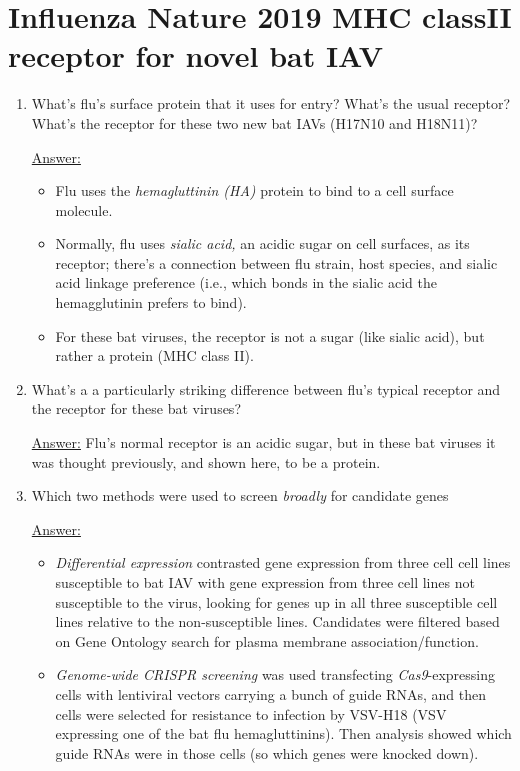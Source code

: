 \documentclass{article}
\newenvironment{QandA}{\begin{enumerate}[label=\bfseries Q\arabic*.]}
                       {\end{enumerate}}
\newenvironment{answered}{\par\normalfont\underline{Answer:}}{}
\begin{document}
\section{Influenza Nature 2019 MHC classII receptor for novel bat IAV}
\begin{QandA}
  \item{What's flu's surface protein that it uses for entry? What's the usual receptor? What's the receptor for these two new bat IAVs (H17N10 and H18N11)?}
    \begin{answered}
    \begin{itemize}
      \item{Flu uses the \textit{hemagluttinin (HA)} protein to bind to a cell surface molecule.}
      \item{Normally, flu uses \textit{sialic acid,} an acidic sugar on cell surfaces, as its receptor; there's a connection between flu strain, host species, and sialic acid linkage preference (i.e., which bonds in the sialic acid the hemagglutinin prefers to bind).}
      \item{For these bat viruses, the receptor is not a sugar (like sialic acid), but rather a protein (MHC class II).}
    \end{itemize}
    \end{answered}
  \item{What's a a particularly striking difference between flu's typical receptor and the receptor for these bat viruses?}
    \begin{answered}
    Flu's normal receptor is an acidic sugar, but in these bat viruses it was thought previously, and shown here, to be a protein.
    \end{answered}
  \item{Which two methods were used to screen \textit{broadly} for candidate genes}
    \begin{answered}
    \begin{itemize}
      \item{\textit{Differential expression} contrasted gene expression from three cell cell lines susceptible to bat IAV with gene expression from three cell lines not susceptible to the virus, looking for genes up in all three susceptible cell lines relative to the non-susceptible lines. Candidates were filtered based on Gene Ontology search for plasma membrane association/function.}
      \item{\textit{Genome-wide CRISPR screening} was used transfecting \textit{Cas9}-expressing cells with lentiviral vectors carrying a bunch of guide RNAs, and then cells were selected for resistance to infection by VSV-H18 (VSV expressing one of the bat flu hemagluttinins). Then analysis showed which guide RNAs were in those cells (so which genes were knocked down).}

\end{itemize}
\end{answered}
\end{QandA}
\end{document}
